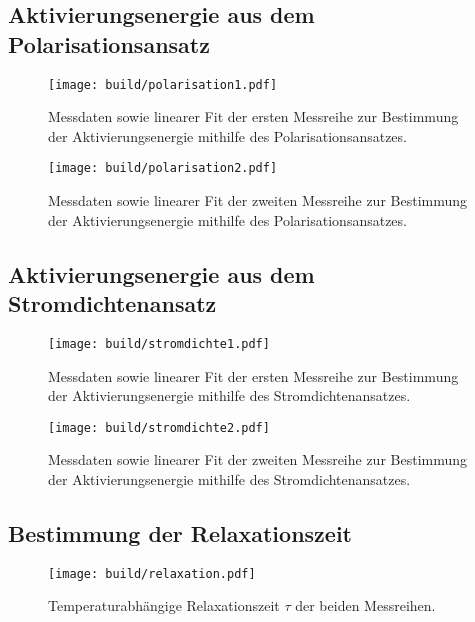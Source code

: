 \FloatBarrier
\subsection{Aktivierungsenergie aus dem Polarisationsansatz}
\begin{figure}
    \centering
    \texttt{[image: build/polarisation1.pdf]}
    \caption{Messdaten sowie linearer Fit der ersten Messreihe zur Bestimmung der Aktivierungsenergie mithilfe des Polarisationsansatzes.}
    \label{fig:Polarisation1}
\end{figure}

\begin{figure}
    \centering
    \texttt{[image: build/polarisation2.pdf]}
    \caption{Messdaten sowie linearer Fit der zweiten Messreihe zur Bestimmung der Aktivierungsenergie mithilfe des Polarisationsansatzes.}
    \label{fig:Polarisation1}
\end{figure}

\FloatBarrier  
\subsection{Aktivierungsenergie aus dem Stromdichtenansatz}
\begin{figure}
    \centering
    \texttt{[image: build/stromdichte1.pdf]}
    \caption{Messdaten sowie linearer Fit der ersten Messreihe zur Bestimmung der Aktivierungsenergie mithilfe des Stromdichtenansatzes.}
    \label{fig:Stromdichte1}
\end{figure}

\begin{figure}
    \centering
    \texttt{[image: build/stromdichte2.pdf]}
    \caption{Messdaten sowie linearer Fit der zweiten Messreihe zur Bestimmung der Aktivierungsenergie mithilfe des Stromdichtenansatzes.}
    \label{fig:Stromdichte2}
\end{figure}

\FloatBarrier
\subsection{Bestimmung der Relaxationszeit}
\begin{figure}
    \centering
    \texttt{[image: build/relaxation.pdf]}
    \caption{Temperaturabhängige Relaxationszeit $\tau$ der beiden Messreihen.}
    \label{fig:Relaxation}
\end{figure}





